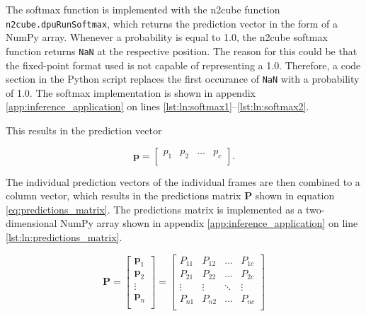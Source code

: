 The softmax function is implemented with the \acrshort{n2cube} function \texttt{n2cube.dpuRunSoftmax}, which returns the prediction vector in the form of a NumPy array.
Whenever a probability is equal to \num{1.0}, the \acrshort{n2cube} softmax function returns \texttt{NaN} at the respective position.
The reason for this could be that the fixed-point format used is not capable of representing a \num{1.0}.
Therefore, a code section in the Python script replaces the first occurance of \texttt{NaN} with a probability of \num{1.0}.
The softmax implementation is shown in appendix \ref{app:inference_application} on lines \ref{lst:ln:softmax1}--\ref{lst:ln:softmax2}.

This results in the prediction vector

\begin{equation}
  \boldsymbol{p} =
  \begin{bmatrix}
    p_1 & p_2 & \dots & p_c \\
  \end{bmatrix}.
  \label{eq:prediction_vector}
\end{equation}

The individual prediction vectors of the individual frames are then combined to a column vector, which results in the predictions matrix $\boldsymbol{P}$ shown in equation \ref{eq:predictions_matrix}.
The predictions matrix is implemented as a two-dimensional NumPy array shown in appendix \ref{app:inference_application} on line \ref{lst:ln:predictions_matrix}.

\begin{equation}
  \boldsymbol{P} =
  \begin{bmatrix}
    \boldsymbol{p}_1 \\
    \boldsymbol{p}_2 \\
    \vdots \\
    \boldsymbol{p}_n \\
  \end{bmatrix} =
  \begin{bmatrix}
    P_{11} & P_{12} & \dots & P_{1c} \\
    P_{21} & P_{22} & \dots & P_{2c} \\
    \vdots & \vdots & \ddots & \vdots \\
    P_{n1} & P_{n2} & \dots & P_{nc} \\
  \end{bmatrix}
  \label{eq:predictions_matrix}
\end{equation}

